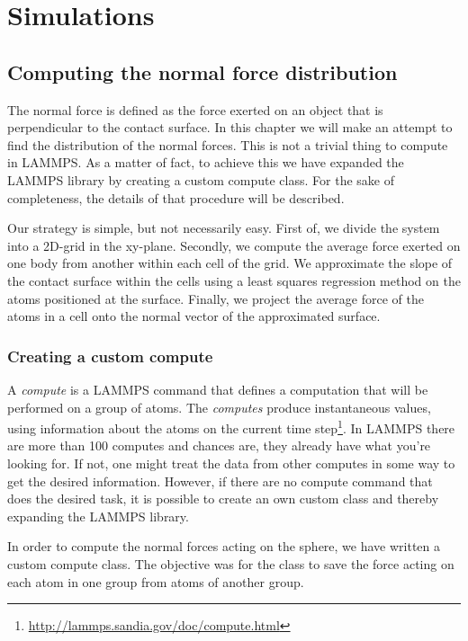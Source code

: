 \documentclass[twoside,english]{uiofysmaster}
\begin{document}
\part{Simulations}

\chapter{Computing the normal force distribution}
The normal force is defined as the force exerted on an object that is perpendicular to the contact surface. 
In this chapter we will make an attempt to find the distribution of the normal forces. 
This is not a trivial thing to compute in LAMMPS. 
As a matter of fact, to achieve this we have expanded the LAMMPS library by creating a custom compute class. 
For the sake of completeness, the details of that procedure will be described. 

Our strategy is simple, but not necessarily easy. 
First of, we divide the system into a 2D-grid in the xy-plane. 
Secondly,  we compute the average force exerted on one body from another within each cell of the grid. 
We approximate the slope of the contact surface within the cells using a least squares regression method on the atoms positioned at the surface. 
Finally, we project the average force of the atoms in a cell onto the normal vector of the approximated surface.


\section{Creating a custom compute}
A \textit{compute} is a LAMMPS command that defines a computation that will be performed on a group of atoms. 
The \textit{computes} produce instantaneous values, using information about the atoms on the current time step\footnote{\href{ http://lammps.sandia.gov/doc/compute.html}{ http://lammps.sandia.gov/doc/compute.html}}.
In LAMMPS there are more than 100 computes and chances are, they already have what you're looking for. If not, one might treat the data from other computes in some way to get the desired information. However, if there are no compute command that does the desired task, it is possible to create an own custom class and thereby expanding the LAMMPS library.  

In order to compute the normal forces acting on the sphere, we have written a custom compute class. 
The objective was for the class to save the force acting on each atom in one group from atoms of another group. 
\end{document}
